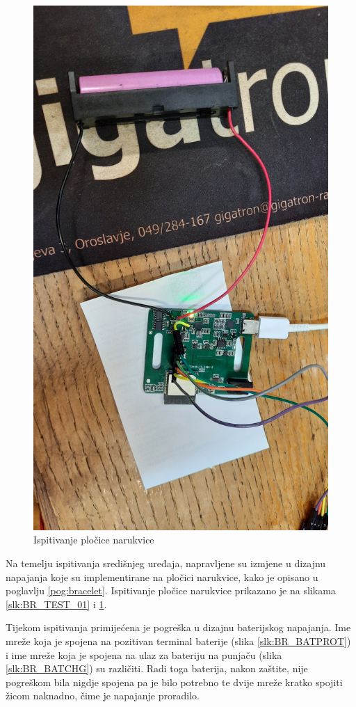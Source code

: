 \begin{figure}[htb]
    \centering
    \includegraphics[width=10 cm]{Figures/BR_TEST_01.jpg}
    \caption{Ispitivanje pločice narukvice}
    \label{slk:BR_TEST_02}
\end{figure}

Na temelju ispitivanja središnjeg uređaja, napravljene su izmjene u dizajnu napajanja koje su implementirane na pločici narukvice, kako je opisano u poglavlju \ref{pog:bracelet}. Ispitivanje pločice narukvice prikazano je na slikama \ref{slk:BR_TEST_01} i \ref{slk:BR_TEST_02}.

Tijekom ispitivanja primijećena je pogreška u dizajnu baterijskog napajanja. Ime mreže koja je spojena na pozitivan terminal baterije (slika \ref{slk:BR_BATPROT}) i ime mreže koja je spojena na ulaz za bateriju na punjaču (slika \ref{slk:BR_BATCHG}) su različiti. Radi toga baterija, nakon zaštite, nije pogreškom bila nigdje spojena pa je bilo potrebno te dvije mreže kratko spojiti žicom naknadno, čime je napajanje proradilo.

